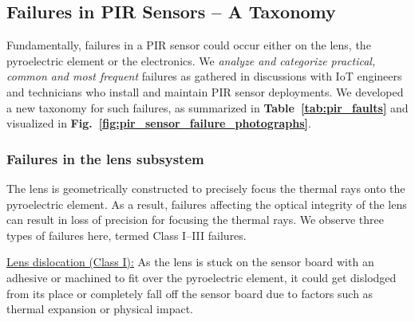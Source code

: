 \subsection{Failures in PIR Sensors -- A Taxonomy} 
\label{subsec:taxonomy} 

Fundamentally, failures in a PIR sensor could occur either on the lens, the pyroelectric element or the electronics. We \textit{analyze and categorize practical, common and most frequent} failures as gathered in discussions with IoT engineers and technicians who install and maintain PIR sensor deployments. 
We developed a new taxonomy for such failures, as summarized in {\bfseries Table~\ref{tab:pir_faults}} and visualized in {\bfseries Fig.~\ref{fig:pir_sensor_failure_photographs}}.%
%
\subsubsection{\textbf{Failures in the lens subsystem}} The lens is geometrically constructed to precisely focus the thermal rays onto the pyroelectric element. As a result, failures affecting the optical integrity of the lens can result in loss of precision for focusing the thermal rays. We observe three types of failures here, termed Class I--III failures.
%

\noindent \underline{Lens dislocation (Class I):} %
As the lens is stuck on the sensor board with an adhesive or machined to fit over the pyroelectric element, it could get dislodged from its place or completely fall off the sensor board due to factors such as thermal expansion or physical impact.


